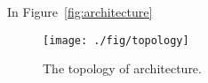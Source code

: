 

In Figure~\ref{fig:architecture}

\begin{figure*}
\centering
\texttt{[image: ./fig/topology]}
\caption{The topology of architecture.}
\label{fig:toplogy}
\end{figure*}

